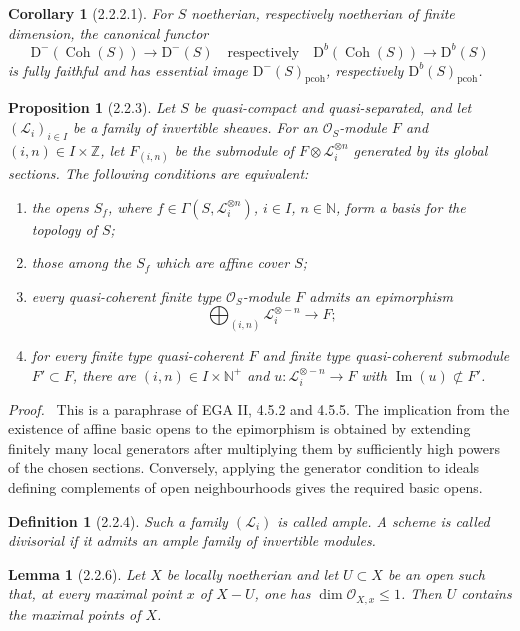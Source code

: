 \documentclass[13pt]{extarticle}
\newcommand{\ZZ}{\mathbb Z}
\newcommand{\NN}{\mathbb N}
\newcommand{\cO}{\mathcal O}
\newcommand{\cL}{\mathcal L}
\newcommand{\D}{\mathrm D}
\newcommand{\Coh}{\operatorname{Coh}}
\newcommand{\Imop}{\operatorname{Im}}
\newenvironment{prooftext}[1][Proof]{\par\noindent\emph{#1.}\ }{\par\medskip}
\newtheorem*{lemma*}{Lemma}
\newtheorem*{proposition*}{Proposition}
\newtheorem*{corollary*}{Corollary}
\newtheorem*{definition*}{Definition}
\begin{document}
\begin{corollary*}[2.2.2.1]
For $S$ noetherian, respectively noetherian of finite dimension, the canonical functor
\[
\D^-(\Coh(S))\longrightarrow \D^-(S)
\quad\text{respectively}\quad
\D^b(\Coh(S))\longrightarrow \D^b(S)
\]
is fully faithful and has essential image $\D^-(S)_{\mathrm{pcoh}}$, respectively $\D^b(S)_{\mathrm{pcoh}}$.
\end{corollary*}

\begin{proposition*}[2.2.3]
Let $S$ be quasi-compact and quasi-separated, and let $(\cL_i)_{i\in I}$ be a family of invertible sheaves. For an $\cO_S$-module $F$ and $(i,n)\in I\times\ZZ$, let $F_{(i,n)}$ be the submodule of $F\otimes\cL_i^{\otimes n}$ generated by its global sections. The following conditions are equivalent:
\begin{enumerate}[label=(\roman*)]
\item the opens $S_f$, where $f\in\Gamma(S,\cL_i^{\otimes n})$, $i\in I$, $n\in\NN$, form a basis for the topology of $S$;
\item those among the $S_f$ which are affine cover $S$;
\item every quasi-coherent finite type $\cO_S$-module $F$ admits an epimorphism
\[
\bigoplus_{(i,n)}\cL_i^{\otimes -n}\longrightarrow F;
\]
\item for every finite type quasi-coherent $F$ and finite type quasi-coherent submodule $F'\subset F$, there are $(i,n)\in I\times\NN^+$ and $u:\cL_i^{\otimes -n}\to F$ with $\Imop(u)\not\subset F'$.
\end{enumerate}
\end{proposition*}

\begin{prooftext}
This is a paraphrase of EGA II, 4.5.2 and 4.5.5. The implication from the existence of affine basic opens to the epimorphism is obtained by extending finitely many local generators after multiplying them by sufficiently high powers of the chosen sections. Conversely, applying the generator condition to ideals defining complements of open neighbourhoods gives the required basic opens.
\end{prooftext}

\begin{definition*}[2.2.4]
Such a family $(\cL_i)$ is called ample. A scheme is called divisorial if it admits an ample family of invertible modules.
\end{definition*}

\begin{lemma*}[2.2.6]
Let $X$ be locally noetherian and let $U\subset X$ be an open such that, at every maximal point $x$ of $X-U$, one has $\dim\cO_{X,x}\le1$. Then $U$ contains the maximal points of $X$.
\end{lemma*}
\end{document}
